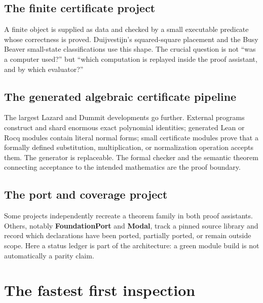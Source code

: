 \documentclass[
  10pt,
  a4paper,
  twoside,
  open=any,
  parskip=half,
  headings=big
]{scrreprt}
\newcommand{\project}[1]{\textsf{\bfseries #1}}
\begin{document}
\subsection{The finite certificate project}

A finite object is supplied as data and checked by a small executable
predicate whose correctness is proved.  Duijvestijn's squared-square placement
and the Busy Beaver small-state classifications use this shape.  The crucial
question is not ``was a computer used?'' but ``which computation is replayed
inside the proof assistant, and by which evaluator?''

\subsection{The generated algebraic certificate pipeline}

The largest Lazard and Dummit developments go further.  External programs
construct and shard enormous exact polynomial identities; generated Lean or
Rocq modules contain literal normal forms; small certificate modules prove
that a formally defined substitution, multiplication, or normalization
operation accepts them.  The generator is replaceable.  The formal checker and
the semantic theorem connecting acceptance to the intended mathematics are
the proof boundary.

\subsection{The port and coverage project}

Some projects independently recreate a theorem family in both proof
assistants.  Others, notably \project{FoundationPort} and \project{Modal},
track a pinned source library and record which declarations have been ported,
partially ported, or remain outside scope.  Here a status ledger is part of the
architecture: a green module build is not automatically a parity claim.

\section{The fastest first inspection}
\end{document}
